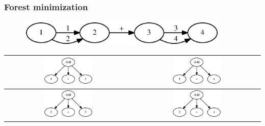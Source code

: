 \documentclass{beamer}
\begin{document}
\begin{frame}
	\transwipe[direction=90]
	\frametitle{Forest minimization}
    \begin{figure}
    \centering
    \includegraphics[width = 0.9\textwidth]{./dot/input1.eps}
  \end{figure}
  \begin{center}
  \begin{tabular}{c | c}
      \includegraphics[width = 0.4\textwidth]{./dot/tree1.eps}      
      &
      \includegraphics[width = 0.4\textwidth]{./dot/tree2.eps}
      \\
      \hline
      \includegraphics[width = 0.4\textwidth]{./dot/tree3.eps}      
      &
      \includegraphics[width = 0.4\textwidth]{./dot/tree4.eps}

  \end{tabular}
    \end{center}
\end{frame}
\end{document}
